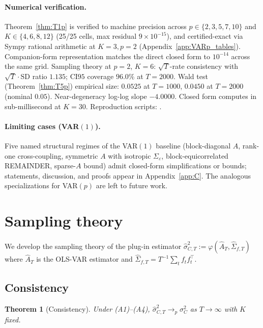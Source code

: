 \documentclass[11pt,letterpaper]{article}
\newtheorem{theorem}{Theorem}
\theoremstyle{remark}
\newcommand{\Sigmae}{\Sigma_\varepsilon}
\begin{document}
\paragraph{Numerical verification.} Theorem~\ref{thm:T1p} is verified to machine precision across $p \in \{2, 3, 5, 7, 10\}$ and $K \in \{4, 6, 8, 12\}$ (25/25 cells, max residual $9 \times 10^{-15}$), and certified-exact via Sympy rational arithmetic at $K=3, p=2$ (Appendix~\ref{app:VARp_tables}). Companion-form representation matches the direct closed form to $10^{-14}$ across the same grid. Sampling theory at $p=2$, $K=6$: $\sqrt{T}$-rate consistency with $\sqrt{T} \cdot \mathrm{SD}$ ratio $1.135$; CI$95$ coverage $96.0\%$ at $T = 2000$. Wald test (Theorem~\ref{thm:T5p}) empirical size: $0.0525$ at $T=1000$, $0.0450$ at $T=2000$ (nominal $0.05$). Near-degeneracy log-log slope $-4.0000$. Closed form computes in sub-millisecond at $K=30$. Reproduction scripts: .

\paragraph{Limiting cases (VAR$(1)$).} Five named structural regimes of the VAR$(1)$ baseline (block-diagonal $A$, rank-one cross-coupling, symmetric $A$ with isotropic $\Sigmae$, block-equicorrelated REMAINDER, sparse-$A$ bound) admit closed-form simplifications or bounds; statements, discussion, and proofs appear in Appendix~\ref{app:C}. The analogous specializations for VAR$(p)$ are left to future work.

\section{Sampling theory}\label{sec:sampling}

We develop the sampling theory of the plug-in estimator $\widehat{\sigma}^2_{C, T} := \varphi(\widehat{A}_T, \widehat{\Sigma}_{f, T})$ where $\widehat{A}_T$ is the OLS-VAR estimator and $\widehat{\Sigma}_{f, T} = T^{-1} \sum_t f_t f_t^\top$.

\subsection{Consistency}\label{sec:T3}

\begin{theorem}[Consistency]\label{thm:T3}
Under (A1)--(A4), $\widehat{\sigma}^2_{C, T} \to_p \sigma^2_C$ as $T \to \infty$ with $K$ fixed.
\end{theorem}
\end{document}
